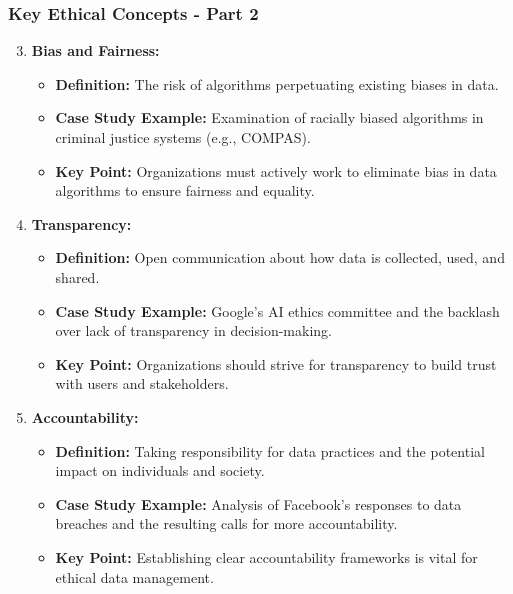 \documentclass[aspectratio=169]{beamer}
\begin{document}
\begin{frame}[fragile]
    \frametitle{Key Ethical Concepts - Part 2}
    \begin{enumerate}
        \setcounter{enumi}{2} %
        \item \textbf{Bias and Fairness:}
        \begin{itemize}
            \item \textbf{Definition:} The risk of algorithms perpetuating existing biases in data.
            \item \textbf{Case Study Example:} Examination of racially biased algorithms in criminal justice systems (e.g., COMPAS).
            \item \textbf{Key Point:} Organizations must actively work to eliminate bias in data algorithms to ensure fairness and equality.
        \end{itemize}

        \item \textbf{Transparency:}
        \begin{itemize}
            \item \textbf{Definition:} Open communication about how data is collected, used, and shared.
            \item \textbf{Case Study Example:} Google’s AI ethics committee and the backlash over lack of transparency in decision-making.
            \item \textbf{Key Point:} Organizations should strive for transparency to build trust with users and stakeholders.
        \end{itemize}

        \item \textbf{Accountability:}
        \begin{itemize}
            \item \textbf{Definition:} Taking responsibility for data practices and the potential impact on individuals and society.
            \item \textbf{Case Study Example:} Analysis of Facebook's responses to data breaches and the resulting calls for more accountability.
            \item \textbf{Key Point:} Establishing clear accountability frameworks is vital for ethical data management.
        \end{itemize}
    \end{enumerate}
\end{frame}
\end{document}
